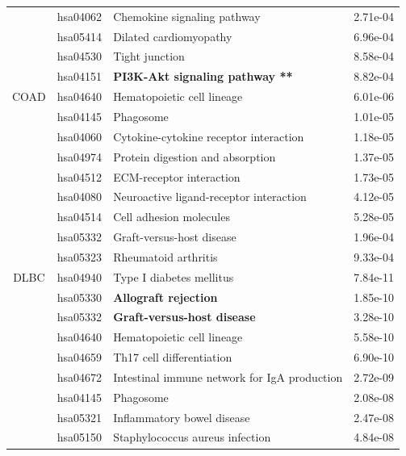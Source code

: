 \begin{longtable}{cllr}
 & hsa04062 & \textcolor{\clrnew}{Chemokine signaling pathway} & 2.71e-04 \\ 
 & hsa05414 & \textcolor{\clrnew}{Dilated cardiomyopathy} & 6.96e-04 \\ 
 & hsa04530 & \textcolor{\clrnew}{Tight junction} & 8.58e-04 \\ 
 \rowcolor{\clrpath}& hsa04151 & \textbf{PI3K-Akt signaling pathway **} & 8.82e-04 \\ 
\midrule 
COAD & hsa04640 & \textcolor{\clrnew}{Hematopoietic cell lineage} & 6.01e-06\\ 
 & hsa04145 & \textcolor{\clrnew}{Phagosome} & 1.01e-05 \\ 
 & hsa04060 & \textcolor{\clrnew}{Cytokine-cytokine receptor interaction} & 1.18e-05 \\ 
 & hsa04974 & \textcolor{\clrnew}{Protein digestion and absorption} & 1.37e-05 \\ 
 & hsa04512 & \textcolor{\clrnew}{ECM-receptor interaction} & 1.73e-05 \\ 
 & hsa04080 & \textcolor{\clrnew}{Neuroactive ligand-receptor interaction} & 4.12e-05 \\ 
 & hsa04514 & \textcolor{\clrnew}{Cell adhesion molecules} & 5.28e-05 \\ 
 & hsa05332 & \textcolor{\clrnew}{Graft-versus-host disease} & 1.96e-04 \\ 
 & hsa05323 & \textcolor{\clrnew}{Rheumatoid arthritis} & 9.33e-04 \\ 
\midrule 
\rowcolor{\clrmatch}DLBC & hsa04940 & Type I diabetes mellitus & 7.84e-11\\ 
 \rowcolor{\clrpath}& hsa05330 & \textbf{Allograft rejection} & 1.85e-10 \\ 
 \rowcolor{\clrpath}& hsa05332 & \textbf{Graft-versus-host disease} & 3.28e-10 \\ 
 \rowcolor{\clrmatch}& hsa04640 & Hematopoietic cell lineage & 5.58e-10 \\ 
 & hsa04659 & \textcolor{\clrnew}{Th17 cell differentiation} & 6.90e-10 \\ 
 \rowcolor{\clrmatch}& hsa04672 & Intestinal immune network for IgA production & 2.72e-09 \\ 
 \rowcolor{\clrmatch}& hsa04145 & Phagosome & 2.08e-08 \\ 
 \rowcolor{\clrmatch}& hsa05321 & Inflammatory bowel disease & 2.47e-08 \\ 
 \rowcolor{\clrmatch}& hsa05150 & Staphylococcus aureus infection & 4.84e-08 \\ 

\end{longtable}
